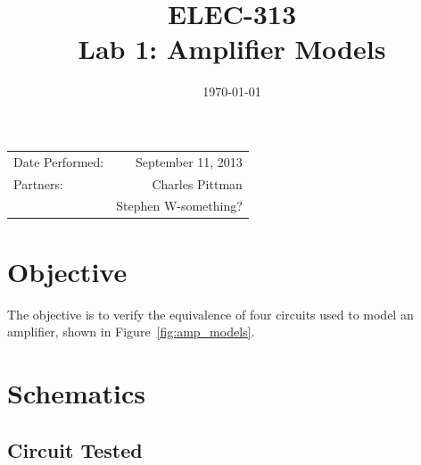 \documentclass{article}
\author{}
\title{ELEC-313 \\ Lab 1: Amplifier Models \\ }
\date{\today}
\begin{document}
\maketitle %

 \begin{center}
   \begin{tabular}{lr}
    Date Performed: & September 11, 2013 \\
    Partners: & Charles Pittman \\
              & Stephen W-something? \\
  \end{tabular}
\end{center}

\pagebreak


\renewcommand{\labelenumi}{\alph{enumi}.}

\section{Objective}

\label{sec:objective}

The objective is to verify the equivalence of four circuits used to model an amplifier, shown in Figure~\ref{fig:amp_models}.

\section{Schematics}
\label{sec:schematics}

\subsection*{Circuit Tested}
\label{sec:ckt_tested}
\end{document}
